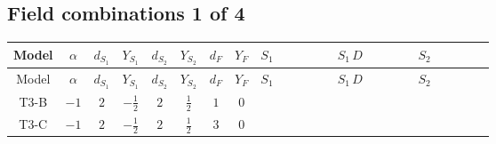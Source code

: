 \documentclass[8pt]{article}
\begin{document}
\begin{landscape}
\subsection*{Field combinations 1 of 4}
\begin{longtable}{@{}cccccccc >{\raggedright\arraybackslash}p{0.21\linewidth} >{\raggedright\arraybackslash}p{0.21\linewidth} >{\raggedright\arraybackslash}p{0.21\linewidth}@{}}
\toprule
Model & $\alpha$ & $d_{S_1}$ & $Y_{S_1}$ & $d_{S_2}$ & $Y_{S_2}$ & $d_F$ & $Y_F$ & $S_1$ & $S_1\,D$ & $S_2$ \\
\midrule
\endfirsthead
\toprule
Model & $\alpha$ & $d_{S_1}$ & $Y_{S_1}$ & $d_{S_2}$ & $Y_{S_2}$ & $d_F$ & $Y_F$ & $S_1$ & $S_1\,D$ & $S_2$ \\
\midrule
\endhead
T3-B & $-1$ & $2$ & $-\frac{1}{2}$ & $2$ & $\frac{1}{2}$ & $1$ & $0$ & \scriptsize\adjustbox{max width=\linewidth}{$\begin{gathered} -S_{1,j_1} S_{1,j_1}{}^{\dagger } m_1^2 \\ +\frac{1}{2} S_{1,j_3} S_{1,j_4} S_{1,j_1}{}^{\dagger } S_{1,j_2}{}^{\dagger } \mathcal{I}_{S_1,j_1,j_3,j_2,j_4}{}^1 \lambda_{S_1}^{(1)}^{(1)}\end{gathered}$} & \scriptsize\adjustbox{max width=\linewidth}{$\begin{gathered} +D_{\mu _1}\left(S_{1,j_1}\right){}^{\dagger } D_{\mu _1}\left(S_{1,j_1}\right)\end{gathered}$} & \scriptsize\adjustbox{max width=\linewidth}{$\begin{gathered} -m_2^2 S_{2,j_1} S_{2,j_1}{}^{\dagger } \\ +\frac{1}{2} S_{2,j_3} S_{2,j_4} S_{2,j_1}{}^{\dagger } S_{2,j_2}{}^{\dagger } \mathcal{I}_{S_2,j_1,j_3,j_2,j_4}{}^1 \lambda_{S_2}^{(1)}^{(1)}\end{gathered}$} \\
\midrule
T3-C & $-1$ & $2$ & $-\frac{1}{2}$ & $2$ & $\frac{1}{2}$ & $3$ & $0$ & \scriptsize\adjustbox{max width=\linewidth}{$\begin{gathered} -S_{1,j_1} S_{1,j_1}{}^{\dagger } m_1^2 \\ +\frac{1}{2} S_{1,j_3} S_{1,j_4} S_{1,j_1}{}^{\dagger } S_{1,j_2}{}^{\dagger } \mathcal{I}_{S_1,j_1,j_3,j_2,j_4}{}^1 \lambda_{S_1}^{(1)}^{(1)}\end{gathered}$} & \scriptsize\adjustbox{max width=\linewidth}{$\begin{gathered} +D_{\mu _1}\left(S_{1,j_1}\right){}^{\dagger } D_{\mu _1}\left(S_{1,j_1}\right)\end{gathered}$} & \scriptsize\adjustbox{max width=\linewidth}{$\begin{gathered} -m_2^2 S_{2,j_1} S_{2,j_1}{}^{\dagger } \\ +\frac{1}{2} S_{2,j_3} S_{2,j_4} S_{2,j_1}{}^{\dagger } S_{2,j_2}{}^{\dagger } \mathcal{I}_{S_2,j_1,j_3,j_2,j_4}{}^1 \lambda_{S_2}^{(1)}^{(1)}\end{gathered}$} \\

\end{longtable}
\end{landscape}
\end{document}
